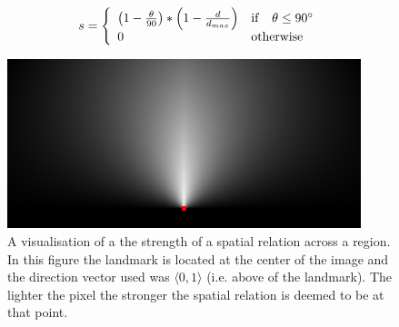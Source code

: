 \begin{equation}
s = \left\{
\begin{array}{l l}
\left(1- \frac{\theta}{90}\right) * \left(1- \frac{d}{d_{max}}\right) & \mathrm{if} \quad \theta \leq 90^{\circ}\\
0 & \mathrm{otherwise}
\end{array} \right.
\label{eq:spatial}
\end{equation}



\begin{figure}
\centerline{
\includegraphics[width=\columnwidth]{./images/spatialRelations/xZeroYOne.png}
}
\caption{A visualisation of a the strength of a spatial relation across a region. In this figure the landmark is located at the center of the image and the direction vector used was $\langle0,1\rangle$ (i.e. above of the landmark). The lighter the pixel the stronger the spatial relation is deemed to be at that point.}
\label{fig:spr}
\end{figure}



